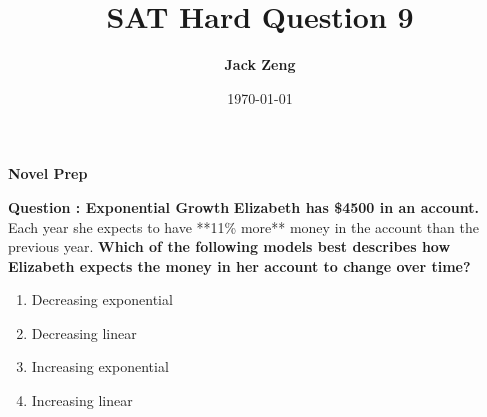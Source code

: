 \documentclass{beamer}
\title[SAT Hard Question]{\textbf{SAT Hard Question 9}}
\author{\textbf{Jack Zeng}}
\institute{\textcolor{white}{\textbf{Novel Prep}}}
\date{\today}
\begin{document}
\begin{frame}
    \titlepage
    \vfill
    \begin{flushright}
        \textcolor{purpleblue}{\Huge \textbf{Novel Prep}}
    \end{flushright}
\end{frame}


\begin{frame}
\end{frame}


\begin{frame}{\textbf{Question : Exponential Growth}}
    \textbf{Elizabeth has \$4500 in an account.} \\
    Each year she expects to have **11\% more** money in the account than the previous year.  
    \vspace{0.3cm}
    \textbf{Which of the following models best describes how Elizabeth expects the money in her account to change over time?}
    
    \vspace{0.5cm}
    \begin{enumerate}
        \item[A.] Decreasing exponential
        \item[B.] Decreasing linear
        \item[C.] Increasing exponential
        \item[D.] Increasing linear
    \end{enumerate}
\end{frame}
\end{document}
